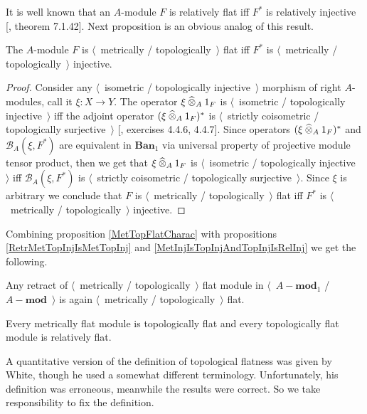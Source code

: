 It is well known that an $A$-module $F$ is relatively flat iff $F^*$ is relatively injective [\cite{HelBanLocConvAlg}, theorem 7.1.42]. Next proposition is an obvious analog of this result.

\begin{proposition}\label{MetTopFlatCharac} The $A$-module $F$ is $\langle$~metrically / topologically~$\rangle$ flat iff $F^*$ is $\langle$~metrically / topologically~$\rangle$ injective.
\end{proposition}
\begin{proof} Consider any $\langle$~isometric / topologically injective~$\rangle$ morphism of right $A$-modules, call it $\xi:X\to Y$. The operator $\xi\mathbin{\widehat{\otimes}}_{A} 1_F$ is $\langle$~isometric / topologically injective~$\rangle$ iff the adjoint operator $(\xi\mathbin{\widehat{\otimes}}_{A} 1_F)^*$ is $\langle$~strictly coisometric / topologically surjective~$\rangle$  [\cite{HelLectAndExOnFuncAn}, exercises 4.4.6, 4.4.7]. Since operators $(\xi\mathbin{\widehat{\otimes}}_{A} 1_F)^*$ and $\mathcal{B}_A(\xi,F^*)$ are equivalent in $\mathbf{Ban}_1$ via universal property of projective module tensor product, then we get that $\xi\mathbin{\widehat{\otimes}}_{A} 1_F$ is $\langle$~isometric / topologically injective~$\rangle$ iff $\mathcal{B}_A(\xi,F^*)$ is $\langle$~strictly coisometric / topologically surjective~$\rangle$. Since $\xi$ is arbitrary we conclude that $F$ is  $\langle$~metrically / topologically~$\rangle$ flat iff $F^*$ is $\langle$~metrically / topologically~$\rangle$ injective.
\end{proof}

Combining proposition \ref{MetTopFlatCharac} with propositions  \ref{RetrMetTopInjIsMetTopInj} and \ref{MetInjIsTopInjAndTopInjIsRelInj} we get the following.

\begin{proposition}\label{RetrMetTopFlatIsMetTopFlat} Any retract of $\langle$~metrically / topologically~$\rangle$ flat module in $\langle$~$A-\mathbf{mod}_1$ / $A-\mathbf{mod}$~$\rangle$ is again $\langle$~metrically / topologically~$\rangle$ flat.
\end{proposition}

\begin{proposition}\label{MetFlatIsTopFlatAndTopFlatIsRelFlat} Every metrically flat module is topologically flat and every topologically flat module is relatively flat.
\end{proposition}

A quantitative version of the definition of topological flatness was given by White, though he used a somewhat different terminology. Unfortunately, his definition was erroneous, meanwhile the results were correct. So we take responsibility to fix the definition.

